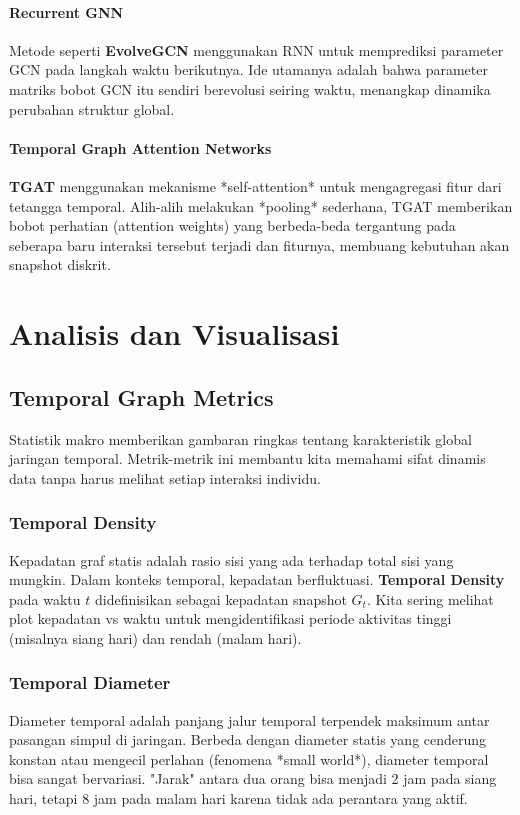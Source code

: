 \documentclass[12pt,a4paper]{book}
\begin{document}
\subsection{Recurrent GNN}
Metode seperti \textbf{EvolveGCN} menggunakan RNN untuk memprediksi parameter GCN pada langkah waktu berikutnya. Ide utamanya adalah bahwa parameter matriks bobot GCN itu sendiri berevolusi seiring waktu, menangkap dinamika perubahan struktur global.

\subsection{Temporal Graph Attention Networks}
\textbf{TGAT} menggunakan mekanisme *self-attention* untuk mengagregasi fitur dari tetangga temporal. Alih-alih melakukan *pooling* sederhana, TGAT memberikan bobot perhatian (attention weights) yang berbeda-beda tergantung pada seberapa baru interaksi tersebut terjadi dan fiturnya, membuang kebutuhan akan snapshot diskrit.

\part{Analisis dan Visualisasi}

\chapter{Temporal Graph Metrics}
Statistik makro memberikan gambaran ringkas tentang karakteristik global jaringan temporal. Metrik-metrik ini membantu kita memahami sifat dinamis data tanpa harus melihat setiap interaksi individu.

\section{Temporal Density}
Kepadatan graf statis adalah rasio sisi yang ada terhadap total sisi yang mungkin. Dalam konteks temporal, kepadatan berfluktuasi.
\textbf{Temporal Density} pada waktu $t$ didefinisikan sebagai kepadatan snapshot $G_t$. Kita sering melihat plot kepadatan vs waktu untuk mengidentifikasi periode aktivitas tinggi (misalnya siang hari) dan rendah (malam hari).

\section{Temporal Diameter}
Diameter temporal adalah panjang jalur temporal terpendek maksimum antar pasangan simpul di jaringan.
Berbeda dengan diameter statis yang cenderung konstan atau mengecil perlahan (fenomena *small world*), diameter temporal bisa sangat bervariasi. "Jarak" antara dua orang bisa menjadi 2 jam pada siang hari, tetapi 8 jam pada malam hari karena tidak ada perantara yang aktif.
\end{document}
